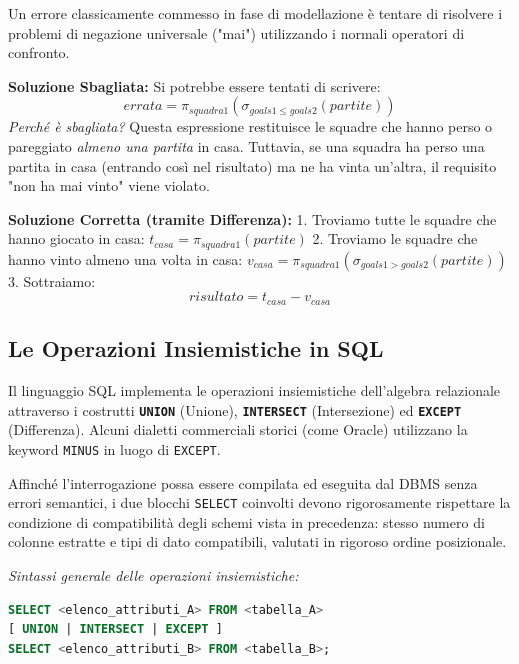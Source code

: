 \begin{example}
    Un errore classicamente commesso in fase di modellazione è tentare di risolvere i problemi di negazione universale ("mai") utilizzando i normali operatori di confronto. 
    
    \textbf{Soluzione Sbagliata:} Si potrebbe essere tentati di scrivere:
    $$ errata = \pi_{squadra1}(\sigma_{goals1 \leq goals2}(partite)) $$
    \textit{Perché è sbagliata?} Questa espressione restituisce le squadre che hanno perso o pareggiato \textit{almeno una partita} in casa. Tuttavia, se una squadra ha perso una partita in casa (entrando così nel risultato) ma ne ha vinta un'altra, il requisito "non ha mai vinto" viene violato.
    
    \textbf{Soluzione Corretta (tramite Differenza):}
    1. Troviamo tutte le squadre che hanno giocato in casa: $t_{casa} = \pi_{squadra1}(partite)$
    2. Troviamo le squadre che hanno vinto almeno una volta in casa: $v_{casa} = \pi_{squadra1}(\sigma_{goals1 > goals2}(partite))$
    3. Sottraiamo:
    $$ risultato = t_{casa} - v_{casa} $$
\end{example}

\subsection{Le Operazioni Insiemistiche in SQL}

Il linguaggio SQL implementa le operazioni insiemistiche dell'algebra relazionale attraverso i costrutti \textbf{\texttt{UNION}} (Unione), \textbf{\texttt{INTERSECT}} (Intersezione) ed \textbf{\texttt{EXCEPT}} (Differenza). Alcuni dialetti commerciali storici (come Oracle) utilizzano la keyword \texttt{MINUS} in luogo di \texttt{EXCEPT}.

Affinché l'interrogazione possa essere compilata ed eseguita dal DBMS senza errori semantici, i due blocchi \texttt{SELECT} coinvolti devono rigorosamente rispettare la condizione di compatibilità degli schemi vista in precedenza: stesso numero di colonne estratte e tipi di dato compatibili, valutati in rigoroso ordine posizionale.

\textit{Sintassi generale delle operazioni insiemistiche:}
\begin{lstlisting}[language=SQL, basicstyle=\ttfamily\small, keywordstyle=\color{blue}\bfseries]
SELECT <elenco_attributi_A> FROM <tabella_A>
[ UNION | INTERSECT | EXCEPT ]
SELECT <elenco_attributi_B> FROM <tabella_B>;
\end{lstlisting}

